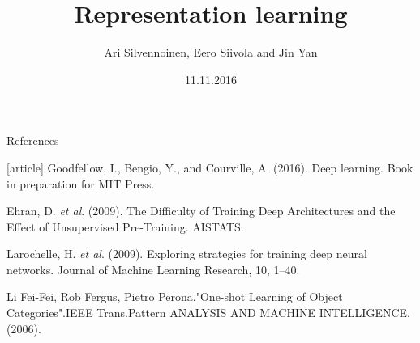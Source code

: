 \documentclass[first=purple,second=blue,logo=blueque]{./misc/aaltoslides}
\title{Representation learning}
\institute[~]{Aalto deep learning course}
\author[~]{Ari Silvennoinen, Eero Siivola and Jin Yan}
\date{11.11.2016}
\begin{document}
\aaltotitleframe




\begin{frame}{References}
\begin{thebibliography}{9}
[article]
Goodfellow, I., Bengio, Y., and Courville, A. (2016). Deep learning. Book in preparation for MIT Press.

 Ehran, D. \textit{et al}. (2009). The Difficulty of Training Deep Architectures and the Effect of Unsupervised Pre-Training. AISTATS.

 Larochelle, H. \textit{et al}. (2009). Exploring strategies for training deep neural networks. Journal of Machine Learning Research, 10, 1--40.

Li Fei-Fei, Rob Fergus, Pietro Perona."One-shot Learning of Object Categories".IEEE Trans.Pattern ANALYSIS AND MACHINE INTELLIGENCE.(2006).

\end{thebibliography}
\end{frame}
\end{document}
